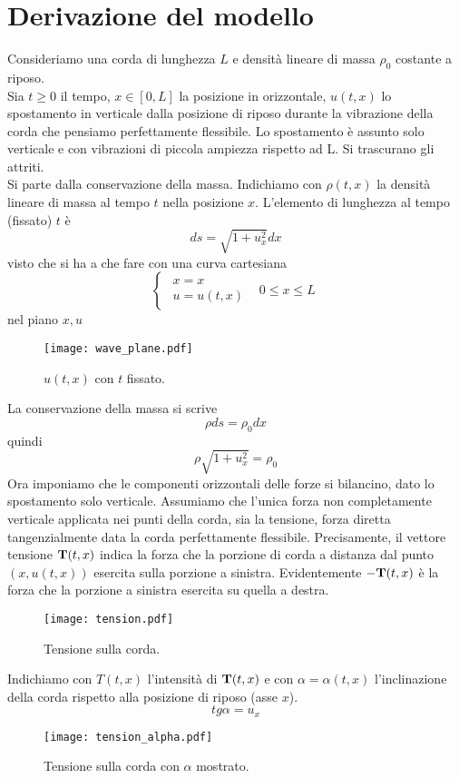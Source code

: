 \section{Derivazione del modello}
Consideriamo una corda di lunghezza $L$ e densit\`a lineare di massa $\rho_0$
costante a riposo.\\
Sia $t≥ 0$ il tempo, $x \in [0,L]$ la posizione in orizzontale,
$u(t,x)$ lo spostamento in verticale dalla posizione di riposo durante la
vibrazione della corda che pensiamo perfettamente flessibile.
Lo spostamento \`e assunto solo verticale e con vibrazioni di piccola ampiezza
rispetto ad L. Si trascurano gli attriti.\\
Si parte dalla conservazione della massa. Indichiamo con $\rho (t,x)$ la
densit\`a
lineare di massa al tempo $t$ nella posizione $x$. L'elemento di lunghezza al
tempo (fissato) $t$ \`e
\[
	ds=\sqrt{1+u_x^2} dx
\]
visto che si ha a che fare con una curva cartesiana
\[
	\left\{
	\begin{array}{ll}
		\begin{array}{l}
			x=x \\
			u=u(t,x)
		\end{array}
	& 0 ≤ x ≤ L
	\end{array}
	\right.
\]
nel piano $x,u$
\begin{figure}[H]
	\centering
	\texttt{[image: wave\_plane.pdf]}
	\caption{$u(t,x)$ con $t$ fissato.}
	\label{wave_plane}
\end{figure}
La conservazione della massa si scrive
\[
	\rho ds= \rho_0 dx
\]
quindi
\[
	\rho \sqrt{1 + u_x^2}= \rho_0
\]
Ora imponiamo che le componenti orizzontali delle forze si bilancino, dato lo
spostamento solo verticale.
Assumiamo che l'unica forza non completamente verticale  applicata nei punti
della corda, sia la tensione, forza diretta tangenzialmente data la corda
perfettamente
flessibile.
Precisamente, il vettore tensione ${\bf T}(t,x)$ indica la forza che la porzione
di corda a distanza dal punto $(x, u(t,x))$ esercita sulla porzione a sinistra.
Evidentemente ${\bf -T}(t,x)$ \`e la forza che la porzione a sinistra esercita
su
quella a destra.
\begin{figure}[H]
	\centering
	\texttt{[image: tension.pdf]}
	\caption{Tensione sulla corda.}
	\label{tension}
\end{figure}
Indichiamo con $T(t,x)$ l'intensit\`a di ${\bf T}(t,x)$ e con $\alpha= \alpha
(t,x)$
l'inclinazione della corda rispetto alla posizione di riposo (asse $x$).
\[
	tg \alpha = u_x
\]
\begin{figure}[H]
	\centering
	\texttt{[image: tension\_alpha.pdf]}
	\caption{Tensione sulla corda con $\alpha$ mostrato.}
	\label{tension_alpha}
\end{figure}
